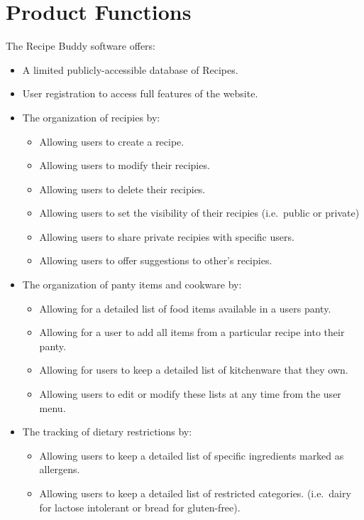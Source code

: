 \documentclass{scrreprt}
\begin{document}
\section{Product Functions}
$ $The \gls{Recipe Buddy} software offers:
\begin{itemize}
    \item A limited publicly-accessible database of Recipes.
    \item User registration to access full features of the website.
    \item The organization of recipies by:
          \begin{itemize}
              \item Allowing users to create a recipe.
              \item Allowing users to modify their recipies.
              \item Allowing users to delete their recipies.
              \item Allowing users to set the visibility of their recipies (i.e.\ public or private)
              \item Allowing users to share private recipies with specific users.
              \item Allowing users to offer suggestions to other's recipies.
          \end{itemize}
    \item The organization of panty items and cookware by:
          \begin{itemize}
              \item Allowing for a detailed list of food items available in a users panty.
              \item Allowing for a user to add all items from a particular recipe into their panty.
              \item Allowing for users to keep a detailed list of kitchenware that they own.
              \item Allowing users to edit or modify these lists at any time from the user menu.
          \end{itemize}
    \item The tracking of dietary restrictions by:
          \begin{itemize}
              \item Allowing users to keep a detailed list of specific ingredients marked as allergens.
              \item Allowing users to keep a detailed list of restricted categories. (i.e.\ dairy for lactose intolerant or bread for gluten-free).

\end{itemize}
\end{itemize}
\end{document}
